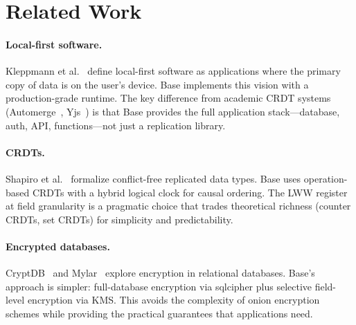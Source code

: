 \section{Related Work}

\label{sec:related}

\paragraph{Local-first software.} Kleppmann et al.~\cite{kleppmann2019} define
local-first software as applications where the primary copy of data is on the
user's device. Base implements this vision with a production-grade runtime.
The key difference from academic CRDT systems (Automerge~\cite{automerge},
Yjs~\cite{yjs}) is that Base provides the full application stack---database,
auth, API, functions---not just a replication library.

\paragraph{CRDTs.} Shapiro et al.~\cite{shapiro2011crdt} formalize
conflict-free replicated data types. Base uses operation-based CRDTs with a
hybrid logical clock for causal ordering. The LWW register at field granularity
is a pragmatic choice that trades theoretical richness (counter CRDTs,
set CRDTs) for simplicity and predictability.

\paragraph{Encrypted databases.} CryptDB~\cite{cryptdb} and
Mylar~\cite{mylar} explore encryption in relational databases.
Base's approach is simpler: full-database encryption via sqlcipher plus
selective field-level encryption via KMS. This avoids the complexity of
onion encryption schemes while providing the practical guarantees that
applications need.

